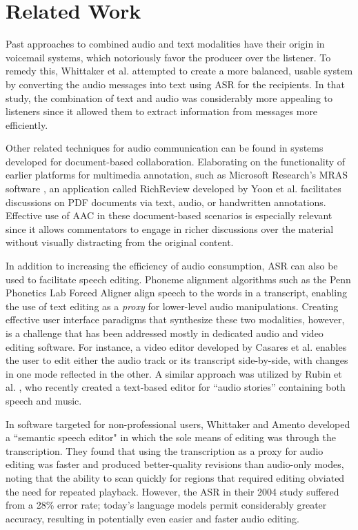 \section{Related Work}
Past approaches to combined audio and text modalities have their origin in voicemail systems, which notoriously favor the producer over the listener. 
To remedy this, Whittaker et al. \cite{whittaker} attempted to create a more balanced, usable system by converting the audio messages into text using ASR for the recipients. 
In that study, the combination of text and audio was considerably more appealing to listeners since it allowed them to extract information from messages more efficiently. 

Other related techniques for audio communication can be found in systems developed for document-based collaboration. 
Elaborating on the functionality of earlier platforms for multimedia annotation, such as Microsoft Research's MRAS software \cite{bargeron,mras}, an application called RichReview developed by Yoon et al. \cite{yoon} facilitates discussions on PDF documents via text, audio, or handwritten annotations. 
Effective use of AAC in these document-based scenarios is especially relevant since it allows commentators to engage in richer discussions over the material without visually distracting from the original content. 

In addition to increasing the efficiency of audio consumption, ASR can also be used to facilitate speech editing. 
Phoneme alignment algorithms such as the Penn Phonetics Lab Forced Aligner \cite{p2fa} align speech to the words in a transcript, enabling the use of text editing as a \emph{proxy} for lower-level audio manipulations.
Creating effective user interface paradigms that synthesize these two modalities, however, is a challenge that has been addressed mostly in dedicated audio and video editing software. 
For instance, a video editor developed by Casares et al. \cite{casares} enables the user to edit either the audio track or its transcript side-by-side, with changes in one mode reflected in the other. 
A similar approach was utilized by Rubin et al. \cite{rubin}, who recently created a text-based editor for ``audio stories'' containing both speech and music.

In software targeted for non-professional users, Whittaker and Amento \cite{whittaker_semantic} developed a ``semantic speech editor" in which the sole means of editing was through the transcription. 
They found that using the transcription as a proxy for audio editing was faster and produced better-quality revisions than audio-only modes, noting that the ability to scan quickly for regions that required editing obviated the need for repeated playback. 
However, the ASR in their 2004 study suffered from a 28\% error rate; today's language models permit considerably greater accuracy, resulting in potentially even easier and faster audio editing.